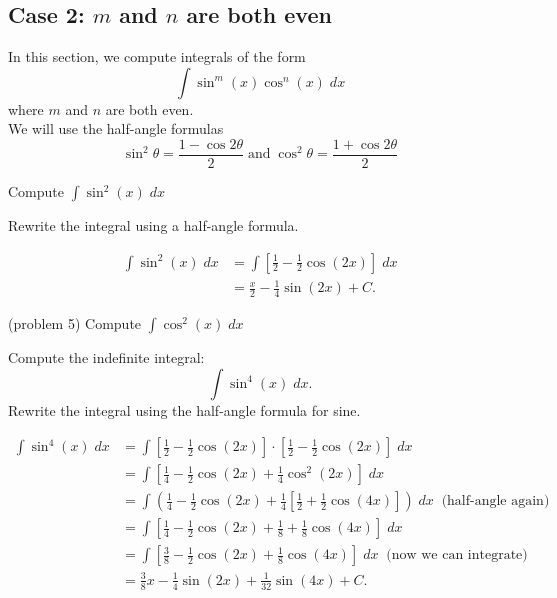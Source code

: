 \documentclass[handout]{ximera}
\begin{document}
\subsection{Case 2: $m$ and $n$ are both even}
In this section, we compute integrals of the form
\[
\int \sin^m(x) \cos^n(x) \; dx
\]
where $m$ and $n$ are both even.\\
We will use the half-angle formulas
\[
\sin^2 \theta = \frac{1 - \cos 2\theta}{2} \; \text{and} \; \cos^2 \theta = \frac{1 + \cos 2\theta}{2}
\]

\begin{example}[example 5]
Compute $\displaystyle{\int \sin^2(x) \; dx}$

Rewrite the integral using a half-angle formula.

\begin{align*}
\int \sin^2(x) \; dx &= \int \left[\frac12- \frac12\cos(2x)\right]  \; dx\\
  &= \frac{x}{2}  - \frac{1}{4}\sin(2x) + C.
\end{align*}
\end{example}

\begin{problem}(problem 5)
Compute $\displaystyle{\int \cos^2(x) \; dx}$
\begin{multipleChoice}
\end{multipleChoice}
\end{problem}

\begin{example}[example 6]
Compute the indefinite integral:
\[
\int \sin^4(x) \; dx.
\]
Rewrite the integral using the half-angle formula for sine.

\begin{align*}
\int \sin^4(x) \; dx &= \int \left[\tfrac12- \tfrac12\cos(2x)\right] \cdot \left[\tfrac12 - \tfrac12\cos(2x)\right] \; dx\\
  &=  \int \left[\tfrac14 - \tfrac12\cos(2x) + \tfrac14\cos^2(2x)\right] \; dx \\
  &= \int \left( \tfrac14 - \tfrac12 \cos(2x) + \tfrac14 
  \left[\tfrac12 + \tfrac12\cos(4x)\right]\right) \; dx  \;\; \text{(half-angle again)} \\
  &= \int \left[\tfrac14 - \tfrac12 \cos(2x) +\tfrac18 + \tfrac18\cos(4x)\right] \; dx\\
  &=  \int \left[\tfrac38 - \tfrac12 \cos(2x) + \tfrac18\cos(4x)\right] \; dx \;\; \text{(now we can integrate)}\\
  &= \tfrac38 x - \tfrac14 \sin(2x) + \tfrac{1}{32}\sin(4x) + C.
\end{align*}
\end{example}
\end{document}
